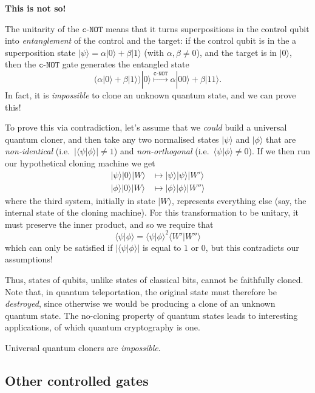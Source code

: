 \documentclass[fleqn]{article}
\newenvironment{idea}{\noindent}{\medskip}
\begin{document}
\textbf{This is not so!}

The unitarity of the \(\texttt{c-NOT}\) means that it turns superpositions in the control qubit into \emph{entanglement} of the control and the target: if the control qubit is in the a superposition state \(|\psi\rangle = \alpha|0\rangle+\beta|1\rangle\) (with \(\alpha,\beta\neq0\)), and the target is in \(|0\rangle\), then the \(\texttt{c-NOT}\) gate generates the entangled state
\[
  \big( \alpha|0\rangle+\beta|1\rangle \big) |0\rangle
  \overset{\texttt{c-NOT}}{\longmapsto}
  \alpha|00\rangle + \beta|11\rangle.
\]
In fact, it is \emph{impossible} to clone an unknown quantum state, and we can prove this!

To prove this via contradiction, let's assume that we \emph{could} build a universal quantum cloner, and then take any two normalised states \(|\psi\rangle\) and \(|\phi\rangle\) that are \emph{non-identical} (i.e.~\(|\langle\psi|\phi\rangle|\neq1\)) and \emph{non-orthogonal} (i.e.~\(\langle\psi|\phi\rangle\neq0\)).
If we then run our hypothetical cloning machine we get
\[
  \begin{aligned}
    |\psi\rangle|0\rangle|W\rangle
    &\mapsto |\psi\rangle|\psi\rangle|W'\rangle
  \\|\phi\rangle|0\rangle|W\rangle
    &\mapsto |\phi\rangle|\phi\rangle|W''\rangle
  \end{aligned}
\]
where the third system, initially in state \(|W\rangle\), represents everything else (say, the internal state of the cloning machine).
For this transformation to be unitary, it must preserve the inner product, and so we require that
\[
  \langle\psi|\phi\rangle
  = \langle\psi|\phi\rangle^2 \langle W'|W''\rangle
\]
which can only be satisfied if \(|\langle\psi|\phi\rangle|\) is equal to \(1\) or \(0\), but this contradicts our assumptions!

Thus, states of qubits, unlike states of classical bits, cannot be faithfully cloned.
Note that, in quantum teleportation, the original state must therefore be \emph{destroyed}, since otherwise we would be producing a clone of an unknown quantum state.
The no-cloning property of quantum states leads to interesting applications, of which quantum cryptography is one.

\begin{idea}
Universal quantum cloners are \emph{impossible}.

\end{idea}

\hypertarget{other-controlled-gates}{%
\subsection{Other controlled gates}\label{other-controlled-gates}}
\end{document}
